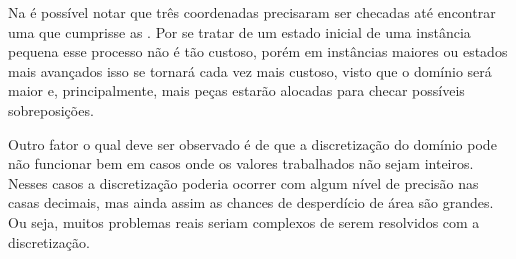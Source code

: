 Na  é possível notar que três coordenadas precisaram ser checadas
até encontrar uma que cumprisse as .
Por se tratar de um estado inicial de uma instância pequena esse processo não é tão custoso,
porém em instâncias maiores ou estados mais avançados isso se tornará cada vez mais custoso,
visto que o domínio será maior e, principalmente, mais peças estarão alocadas para checar
possíveis sobreposições.



Outro fator o qual deve ser observado é de que a discretização do domínio pode não funcionar bem em
casos onde os valores trabalhados não sejam inteiros.
Nesses casos a discretização poderia ocorrer com algum nível de precisão nas casas decimais,
mas ainda assim as chances de desperdício de área são grandes.
Ou seja, muitos problemas reais seriam complexos de serem resolvidos com a discretização.
